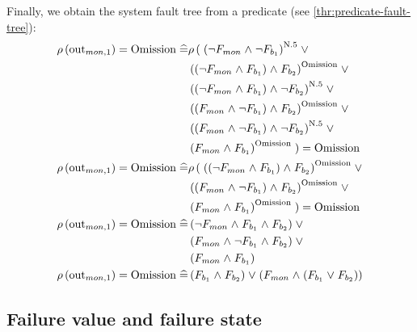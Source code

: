 Finally, we obtain the system fault tree from a predicate (see \cref{thr:predicate-fault-tree}):
\begin{align*}
\rho\left(\mathrm{out}_{mon,1}\right) = \mathrm{Omission} \mathrel{\widehat{=}} &
  \rho\left(\right.
    \left( 
      \neg F_{mon} \mathrel{\wedge} \neg F_{b_1}  
    \right)^{\mathrm{N}.5} \mathrel{\vee} \\
    & \left(
      \left(\neg F_{mon} \mathrel{\wedge} F_{b_1}\right) \mathrel{\wedge} F_{b_2} 
    \right)^{\mathrm{Omission} } \mathrel{\vee}  \\
    & \left(
      \left(\neg F_{mon} \mathrel{\wedge} F_{b_1}\right) \mathrel{\wedge} \neg F_{b_2}
    \right)^{\mathrm{N}.5} \mathrel{\vee} \\ 
    & \left(
      \left(F_{mon} \mathrel{\wedge} \neg F_{b_1}\right) \mathrel{\wedge} F_{b_2}
    \right)^{\mathrm{Omission}} \mathrel{\vee} \\
    & \left(
      \left(F_{mon} \mathrel{\wedge} \neg F_{b_1} \right) \mathrel{\wedge} \neg F_{b_2}
    \right)^{\mathrm{N}.5} \mathrel{\vee} \\
    & \left(
      F_{mon} \mathrel{\wedge} F_{b_1}
    \right)^{\mathrm{Omission}}
  \left.\right) = \mathrm{Omission}\\
\rho\left(\mathrm{out}_{mon,1}\right) = \mathrm{Omission} \mathrel{\widehat{=}} &
  \rho\left(\right.
    \left(
      \left(\neg F_{mon} \mathrel{\wedge} F_{b_1}\right) \mathrel{\wedge} F_{b_2} 
    \right)^{\mathrm{Omission} } \mathrel{\vee} \\  
    & \left(
      \left(F_{mon} \mathrel{\wedge} \neg F_{b_1}\right) \mathrel{\wedge} F_{b_2}
    \right)^{\mathrm{Omission}} \mathrel{\vee} \\
    & \left(
      F_{mon} \mathrel{\wedge} F_{b_1}
    \right)^{\mathrm{Omission}}
  \left.\right) = \mathrm{Omission} \\
\rho\left(\mathrm{out}_{mon,1}\right) = \mathrm{Omission} \mathrel{\widehat{=}} & 
  \left(
    \neg F_{mon} \mathrel{\wedge} F_{b_1} \mathrel{\wedge} F_{b_2} 
  \right) \mathrel{\vee} \\  
  & \left(
    F_{mon} \mathrel{\wedge} \neg F_{b_1}\mathrel{\wedge} F_{b_2}
  \right) \mathrel{\vee} \\
  & \left(
    F_{mon} \mathrel{\wedge} F_{b_1}
  \right) \\
\rho\left(\mathrm{out}_{mon,1}\right) = \mathrm{Omission} \mathrel{\widehat{=}} & 
  \left(F_{b_1} \mathrel{\wedge} F_{b_2}\right) \mathrel{\vee}
  \left(F_{mon} \mathrel{\wedge} \left(F_{b_1} \mathrel{\vee} F_{b_2}\right) \right)
\end{align*}

\subsection{Failure value and failure state}

